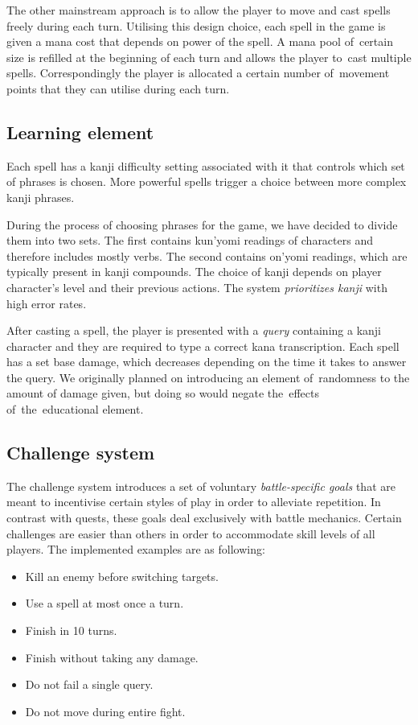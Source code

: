 \documentclass[thesis=B,english,hidelinks]{FITthesisXE}[2012/06/26]
\begin{document}
The other mainstream approach is to allow the player to move and cast spells freely during each turn. Utilising this design choice, each spell in the game is given a mana cost that depends on power of the spell. A mana pool of~certain size is refilled at the beginning of each turn and allows the player to~cast multiple spells. Correspondingly the player is allocated a certain number of~movement points that they can utilise during each turn.

\subsection{Learning element}

Each spell has a kanji difficulty setting associated with it that controls which set of phrases is chosen. More powerful spells trigger a choice between more complex kanji phrases.

During the process of choosing phrases for the game, we have decided to divide them into two sets. The first contains kun'yomi readings of characters and therefore includes mostly verbs. The second contains on'yomi readings, which are typically present in kanji compounds. The choice of kanji depends on player character's level and their previous actions. The system \emph{prioritizes kanji} with high error rates.

\newpage

After casting a spell, the player is presented with a \emph{query} containing a kanji character and they are required to type a correct kana transcription. Each spell has a set base damage, which decreases depending on the time it takes to answer the query. We originally planned on introducing an element of~randomness to the amount of damage given, but doing so would negate the~effects of~the~educational element\autocite{lenses}.

\subsection{Challenge system}

The challenge system introduces a set of voluntary \emph{battle-specific goals} that are meant to incentivise certain styles of play in order to alleviate repetition. In contrast with quests, these goals deal exclusively with battle mechanics. Certain challenges are easier than others in order to accommodate skill levels of all players. The implemented examples are as following:

\begin{itemize}
\item Kill an enemy before switching targets.
\item Use a spell at most once a turn.
\item Finish in 10 turns.
\item Finish without taking any damage.
\item Do not fail a single query.
\item Do not move during entire fight.
\end{itemize}
\end{document}
